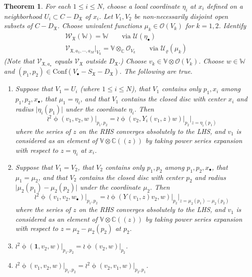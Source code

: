\documentclass[11pt,b5paper,notitlepage]{article}
\theoremstyle{definition}
\theoremstyle{plain}
\newtheorem{thm}[df]{Theorem}
\newcommand{\fk}{\mathfrak}
\newcommand{\Conf}{\mathrm{Conf}}
\newcommand{\SV}{\mathscr{V}}
\newcommand{\scr}{\mathscr}
\newcommand{\DX}{D_{\fk X}}
\newcommand{\blt}{\bullet}
\newcommand{\Vbb}{\mathbb V}
\newcommand{\Wbb}{\mathbb W}
\newcommand{\Cbb}{\mathbb C}
\newcommand{\ibf}{\mathbf 1}
\newcommand{\<}{\left\langle}
\renewcommand{\>}{\right\rangle}
\newcommand{\MO}{\mathcal{O}}
\newcommand{\MU}{\mathcal{U}}
\newcommand{\fx}{\mathfrak{X}}
\newcommand{\SW}{\mathscr{W}}
\numberwithin{equation}{subsection}
\begin{document}
\begin{thm}\label{lb18}
For each $1\leq i\leq N$, choose a local coordinate $\eta_i$ at $x_i$ defined on a neighborhood $U_i\subset C-\DX$ of $x_i$. Let $V_1,V_2$ be non-necessarily disjoint open subsets of $C-\DX$. Choose univalent functions $\mu_k\in \MO(V_k)$ for $k=1,2$.  Identify
\begin{subequations}
\begin{gather}
\SW_\fx(\Wbb)=\Wbb\qquad\text{via }\MU(\eta_\blt)\\
\SV_{\fx,a_1,\cdots,a_M}\vert_{V_k}=\Vbb\otimes_\Cbb \MO_{V_k}\qquad\text{via }\MU_\varrho(\mu_k)
\end{gather}
\end{subequations}
(Note that $\scr V_{\fk X,a_\star}$ equals $\scr V_{\fk X}$ outside $\DX$.) Choose $v_k\in \Vbb\otimes\MO(V_k)$.   Choose $w\in \Wbb$ and $(p_1,p_2)\in \Conf(V_\blt-S_\fx-D_\fx)$. The following are true.
    \begin{enumerate}[label=(\arabic*)]
        \item Suppose that $V_1=U_i$ (where $1\leq i\leq N$), that $V_1$ contains only $p_1,x_i$ among $p_1,p_2,x_\blt$, that $\mu_1=\eta_i$, and that $V_1$ contains the closed disc with center $x_i$ and radius $\vert \eta_i(p_1)\vert$ under the coordinate $\eta_i$. Then
        $$
        \wr^2\upphi(v_1,v_2,w)\vert_{p_1,p_2}=\wr \upphi(v_2,Y_i(v_1,z)w)\vert_{p_2}\vert_{z=\eta_i(p_1)}
        $$
        where the series of $z$ on the RHS converges absolutely to the LHS, and $v_1$ is considered as an element of $\Vbb\otimes\Cbb((z))$ by taking power series expansion with respect to $z=\eta_i$ at $x_i$.
        \item Suppose that $V_1=V_2$, that $V_2$  contains only $p_1,p_2$ among $p_1,p_2,x_\blt$, that $\mu_1=\mu_2$, and that $V_2$ contains the closed disc with center $p_2$ and radius $\vert \mu_2(p_1)-\mu_2(p_2)\vert$ under the coordinate $\mu_2$. Then
        $$
        \wr^2\upphi(v_1,v_2,w_\blt)\vert_{p_1,p_2}=\wr\upphi(Y(v_1,z)v_2,w)\vert_{p_2}\vert_{z=\mu_2(p_1)-\mu_2(p_2)}
        $$
        where the series of $z$ on the RHS converges absolutely to the LHS, and $v_1$ is considered as an element of $\Vbb\otimes \Cbb((z))$ by taking power series expansion with respect to $z=\mu_2-\mu_2(p_2)$ at $p_2$.
        \item $\displaystyle         \wr^2\upphi(\ibf,v_2,w)\vert_{p_1,p_2}=\wr\upphi(v_2,w)\vert_{p_2}$.
        \item $\displaystyle         \wr^2 \upphi(v_1,v_2,w)\vert_{p_1,p_2}=\wr^2\upphi(v_2,v_1,w)\vert_{p_2,p_1}$.
    \end{enumerate}
\end{thm}
\end{document}
